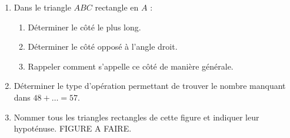 \begin{activite}
\begin{spacing}{1.5}
\begin{enumerate}
            \begin{Geometrie}[CoinBG={(-u,-u)},CoinHD={(8u,4u)}]
                u:=0.4cm;
                pair I,J,K;
                I=u*(1,1);
                J=u*(7,1);            
                K=3/5[I,rotation(J,I,90)];
                label.llft(btex I etex,I);
                label.lrt(btex  J etex,J);
                label.ulft(btex  K etex,K);
                trace I--J--K--cycle;
                trace codeperp(K,I,J,5);
            \end{Geometrie}       
            \item Dans le triangle $ABC$ rectangle en $A$ :
            \begin{enumerate}
                \item Déterminer le côté le plus long.
                \item Déterminer le côté opposé à l'angle droit.
                \item Rappeler comment s'appelle ce côté de manière générale.
            \end{enumerate}
            \item Déterminer le type d'opération permettant de trouver le nombre manquant dans $48 + \dots = 57$.
            \item Nommer tous les triangles rectangles de cette figure et indiquer leur hypoténuse. FIGURE A FAIRE.
        \end{enumerate}
    \end{spacing}
\end{activite}